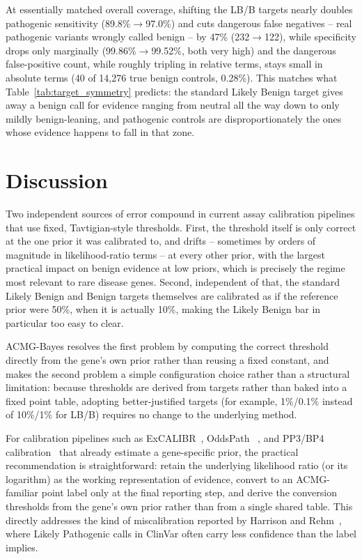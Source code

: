 \documentclass[11pt]{article}
\newcommand{\excalibr}{ExCALIBR\xspace}
\begin{document}
At essentially matched overall coverage, shifting the LB/B targets nearly
doubles pathogenic sensitivity (89.8\%$\to$97.0\%) and cuts dangerous
false negatives -- real pathogenic variants wrongly called benign -- by
47\% (232$\to$122), while specificity drops only marginally
(99.86\%$\to$99.52\%, both very high) and the dangerous false-positive
count, while roughly tripling in relative terms, stays small in absolute
terms (40 of 14{,}276 true benign controls, 0.28\%). This matches what
Table~\ref{tab:target_symmetry} predicts: the standard Likely Benign target
gives away a benign call for evidence ranging from neutral all the way down
to only mildly benign-leaning, and pathogenic controls are disproportionately
the ones whose evidence happens to fall in that zone.

\section*{Discussion}

Two independent sources of error compound in current assay calibration
pipelines that use fixed, Tavtigian-style thresholds. First, the threshold
itself is only correct at the one prior it was calibrated to, and drifts --
sometimes by orders of magnitude in likelihood-ratio terms -- at every other
prior, with the largest practical impact on benign evidence at low priors,
which is precisely the regime most relevant to rare disease genes. Second,
independent of that, the standard Likely Benign and Benign targets
themselves are calibrated as if the reference prior were 50\%, when it is
actually 10\%, making the Likely Benign bar in particular too easy to clear.

ACMG-Bayes resolves the first problem by computing the correct threshold
directly from the gene's own prior rather than reusing a fixed constant, and
makes the second problem a simple configuration choice rather than a
structural limitation: because thresholds are derived from targets rather
than baked into a fixed point table, adopting better-justified targets (for
example, 1\%/0.1\% instead of 10\%/1\% for LB/B) requires no change to the
underlying method.

For calibration pipelines such as \excalibr~\cite{igvf_pp}, OddsPath
~\cite{brnich2020recommendations}, and PP3/BP4
calibration~\cite{pejaver2022calibration} that already estimate a
gene-specific prior, the practical recommendation is straightforward:
retain the underlying likelihood ratio (or its logarithm) as the working
representation of evidence, convert to an ACMG-familiar point label only at
the final reporting step, and derive the conversion thresholds from the
gene's own prior rather than from a single shared table. This directly
addresses the kind of miscalibration reported by Harrison and
Rehm~\cite{Harrison2019}, where Likely Pathogenic calls in ClinVar often
carry less confidence than the label implies.
\end{document}
